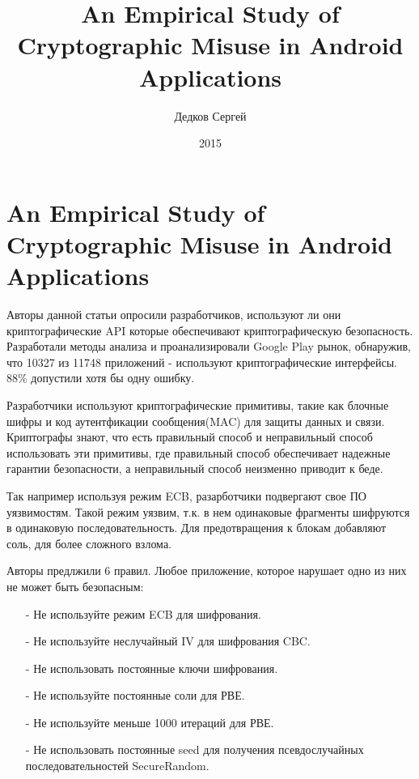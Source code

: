 \documentclass[11pt, a4paper]{article}		%
\author{Дедков Сергей}
\title{An Empirical Study of Cryptographic Misuse in Android Applications}
\date{2015}
\begin{document}
\maketitle

\section{An Empirical Study of Cryptographic Misuse in Android Applications}

Авторы данной статьи опросили разработчиков, используют ли они криптографические API которые обеспечивают криптографическую безопасность.
Разработали методы анализа и проанализировали Google Play рынок, обнаружив, что 10327 из 11748 приложений - используют криптографические интерфейсы. 88\% допустили хотя бы одну ошибку.

Разработчики используют криптографические примитивы, такие как блочные шифры и код аутентфикации сообщения(MAC) для защиты данных и связи. Криптографы знают, что есть правильный способ и неправильный способ использовать эти примитивы, где правильный способ обеспечивает надежные гарантии безопасности, а неправильный способ неизменно приводит к беде.

Так например используя режим ECB, разарботчики подвергают свое ПО уязвимостям. Такой режим уязвим, т.к. в нем одинаковые фрагменты шифруются в одинаковую последовательность. Для предотвращения к блокам добавляют соль, для более сложного взлома.

Авторы предлжили 6 правил. Любое приложение, которое нарушает одно из них не может быть безопасным:

\begin{itemize}

\item[-] Не используйте режим ECB для шифрования. 

\item[-] Не используйте неслучайный IV для шифрования CBC.

\item[-] Не использовать постоянные ключи шифрования.

\item[-] Не используйте постоянные соли для РВЕ.

\item[-] Не используйте меньше 1000 итераций для РВЕ.

\item[-]  Не использовать постоянные seed для получения псевдослучайных последовательностей SecureRandom.

\end{itemize}
\end{document}
